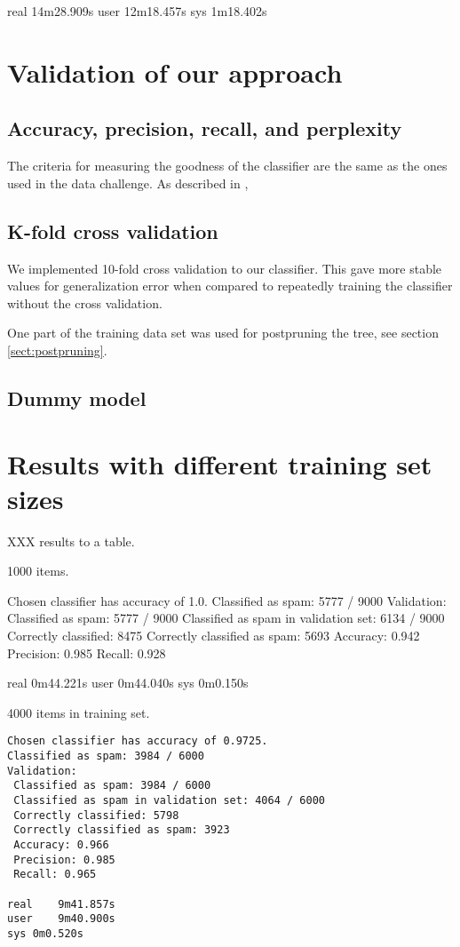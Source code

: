 \documentclass[a4paper,10pt]{article}
\begin{document}
real	14m28.909s
user	12m18.457s
sys	1m18.402s

\section{Validation of our approach}

\subsection{Accuracy, precision, recall, and perplexity}

The criteria for measuring the goodness of the classifier are the same
as the ones used in the data challenge.  As described in
\cite{termproject}, 

\subsection{K-fold cross validation}

We implemented 10-fold cross validation to our classifier.  This
gave more stable values for generalization error when compared to
repeatedly training the classifier without the cross validation.

One part of the training data set was used for postpruning the tree, see
section \ref{sect:postpruning}.

\subsection{Dummy model}


\section{Results with different training set sizes}

XXX results to a table.

1000 items.

\begin{outputlog}
Chosen classifier has accuracy of 1.0.
Classified as spam: 5777 / 9000
Validation:
 Classified as spam: 5777 / 9000
 Classified as spam in validation set: 6134 / 9000
 Correctly classified: 8475
 Correctly classified as spam: 5693
 Accuracy: 0.942
 Precision: 0.985
 Recall: 0.928

real	0m44.221s
user	0m44.040s
sys	0m0.150s
\end{outputlog}

4000 items in training set.

\begin{verbatim}
Chosen classifier has accuracy of 0.9725.
Classified as spam: 3984 / 6000
Validation:
 Classified as spam: 3984 / 6000
 Classified as spam in validation set: 4064 / 6000
 Correctly classified: 5798
 Correctly classified as spam: 3923
 Accuracy: 0.966
 Precision: 0.985
 Recall: 0.965

real	9m41.857s
user	9m40.900s
sys	0m0.520s
\end{verbatim}
\end{document}
